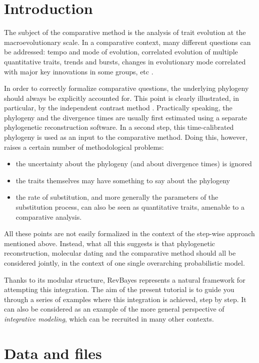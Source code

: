 \section{Introduction}

The subject of the comparative method is the analysis of trait evolution at the macroevolutionary scale.
In a comparative context, many different questions can be addressed: tempo and mode of evolution, correlated evolution of multiple quantitative traits, trends and bursts, changes in evolutionary mode correlated with major key innovations in some groups, etc \citep[see][for a good introduction]{Harvey:1991p899}.

In order to correctly formalize comparative questions, the underlying phylogeny should always be explicitly accounted for. This point is clearly illustrated, in particular, by the independent contrast method \citep{Felsenstein:1985p686}. Practically speaking, the phylogeny and the divergence times are usually first estimated using a separate phylogenetic reconstruction software. In a second step, this time-calibrated phylogeny is used as an input to the comparative method.
Doing this, however, raises a certain number of methodological problems:
\begin{itemize}
\item
the uncertainty about the phylogeny (and about divergence times) is ignored
\item
the traits themselves may have something to say about the phylogeny
\item
the rate of substitution, and more generally the parameters of the substitution process, can also be seen as quantitative traits, amenable to a comparative analysis.
\end{itemize}
All these points are not easily formalized in the context of the step-wise approach mentioned above.
Instead, what all this suggests is that phylogenetic reconstruction, molecular dating and the comparative method should all be considered jointly, in the context of one single overarching probabilistic model.

Thanks to its modular structure, RevBayes represents a natural framework for attempting this integration.
The aim of the present tutorial is to guide you through a series of examples where this integration is achieved, step by step.
It can also be considered as an example of the more general perspective of \emph{integrative modeling}, which can be recruited in many other contexts.

\section{Data and files}

